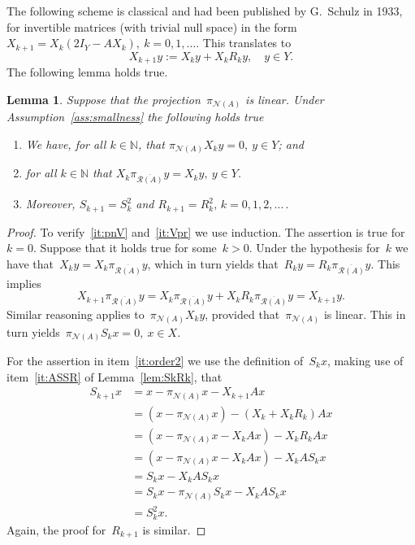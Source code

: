 \documentclass[12pt]{amsart}
\newcommand{\lr}[1]{\left(#1\right)}
\newcommand{\range}{\mathcal R}
\newcommand{\N}{\mathcal N}
\newcommand{\pr}{\pi_{\overline{\range(A)}}}
\newtheorem{lemma}{Lemma}
\theoremstyle{remark}
\begin{document}
The following scheme is classical and had been published by G.~Schulz in 1933,
\cite{https://doi.org/10.1002/zamm.19330130111} for invertible
matrices (with trivial null space) in the form~$X_{k+1} = X_{k}(2I_Y - A X_{k}),\ k=0,1,\dots$.
This translates to
\begin{equation}
  \label{eq:schulz}
  X_{k+1}y := X_{k}y + X_kR_k y,\quad y\in Y.
\end{equation}
The following lemma holds true.
\begin{lemma}
  \label{lem:Vk2}
  Suppose that the projection~$\pi_{\N(A)}$ is linear.
  Under Assumption~\ref{ass:smallness}  the following holds true
   \begin{enumerate}
   \item\label{it:pnV} We have, for all $k \in \mathbb{N}$, that $\pi_{\N(A)}X_{k}y=0,\ y\in Y$; and
   \item\label{it:Vpr} for all $k \in \mathbb{N}$ that $X_{k}\pr y = X_{k}y,\ y\in Y$.
        \item\label{it:k+1} 
   Moreover, $S_{k+1} = S_{k}^{2}$ and $R_{k+1}= R_{k}^{2},\,  k=0,1,2,\dots\,.$\label{it:order2}
   \end{enumerate}
 \end{lemma}
 \begin{proof}
     To verify~\eqref{it:pnV} and~\eqref{it:Vpr} we use induction. The assertion is true
   for~$k=0$. Suppose that it holds true for some~$k>0$. 
  Under the hypothesis for~$k$ we have that~$X_k y = X_k\pr y$, which in turn yields that~$R_ky = R_k \pr y$. 
  This implies
  $$
   X_{k+1}\pr y = X_k\pr y + X_kR_k\pr y  = X_{k+1} y.
  $$
  Similar reasoning applies to~$\pi_{\N(A)}X_ky$, provided that~$\pi_{\N(A)}$ is linear. This in turn yields~$\pi_{\N(A)} S_kx=0,\ x\in X$.
   \par
   For the assertion in item~\eqref{it:order2} we use the definition of~$S_k x$, making use of item~\eqref{it:ASSR} of Lemma~\ref{lem:SkRk}, that
   \begin{align*}
     S_{k+1}x &= x  - \pi_{\N(A)}x - X_{k+1}Ax\\
             &= \lr{x - \pi_{\N(A)}x  } - \lr{X_{k} + X_{k}R_k}Ax\\
             &=  \lr{x - \pi_{\N(A)}x -X_{k}Ax} - X_{k}R_kAx\\
             &=  \lr{x - \pi_{\N(A)}x -X_{k}Ax} - X_{k}A S_kx\\
     &= S_{k}x - X_{k}AS_k x\\
     &= S_{k}x  - \pi_{\N(A)}S_k x - X_{k}AS_kx\\
     &= S_{k}^{2}x.
   \end{align*}
   Again, the proof for~$R_{k+1}$ is similar.
 \end{proof}
\end{document}
